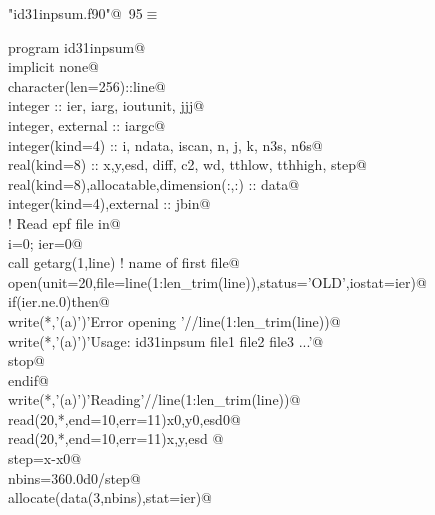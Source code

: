 \documentclass[10pt,a4paper,notitlepage]{article}
\begin{document}
\begin{flushleft} \small\label{scrap119}\raggedright\small
{} \verb@"id31inpsum.f90"@\nobreak\ {\footnotesize {95}}$\equiv$
\vspace{-1ex}
\begin{list}{}{} \item
\mbox{}\verb@      program id31inpsum@\\
\mbox{}\verb@      implicit none@\\
\mbox{}\verb@      character(len=256)::line@\\
\mbox{}\verb@      integer :: ier, iarg, ioutunit, jjj@\\
\mbox{}\verb@      integer, external :: iargc@\\
\mbox{}\verb@      integer(kind=4) :: i, ndata, iscan, n, j, k, n3s, n6s@\\
\mbox{}\verb@      real(kind=8) :: x,y,esd, diff, c2, wd, tthlow, tthhigh, step@\\
\mbox{}\verb@      real(kind=8),allocatable,dimension(:,:) :: data@\\
\mbox{}\verb@      integer(kind=4),external :: jbin@\\
\mbox{}\verb@! Read epf file in@\\
\mbox{}\verb@      i=0; ier=0@\\
\mbox{}\verb@      call getarg(1,line) ! name of first file@\\
\mbox{}\verb@      open(unit=20,file=line(1:len_trim(line)),status='OLD',iostat=ier)@\\
\mbox{}\verb@      if(ier.ne.0)then@\\
\mbox{}\verb@       write(*,'(a)')'Error opening '//line(1:len_trim(line))@\\
\mbox{}\verb@       write(*,'(a)')'Usage: id31inpsum file1 file2 file3 ...'@\\
\mbox{}\verb@       stop@\\
\mbox{}\verb@      endif@\\
\mbox{}\verb@      write(*,'(a)')'Reading'//line(1:len_trim(line))@\\
\mbox{}\verb@      read(20,*,end=10,err=11)x0,y0,esd0@\\
\mbox{}\verb@      read(20,*,end=10,err=11)x,y,esd      @\\
\mbox{}\verb@      step=x-x0@\\
\mbox{}\verb@      nbins=360.0d0/step@\\
\mbox{}   allocate(data(3,nbins),stat=ier)@\\

\end{list}
\end{flushleft}
\end{document}
